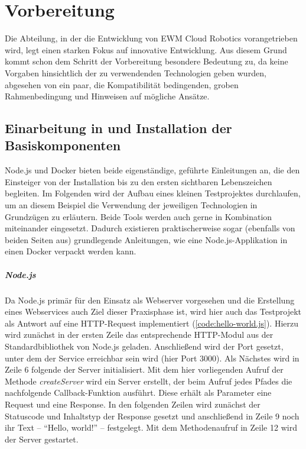 \chapter{Vorbereitung}
Die Abteilung, in der die Entwicklung von \ac{EWM} Cloud Robotics vorangetrieben wird, legt einen starken Fokus auf innovative Entwicklung.
Aus diesem Grund kommt schon dem Schritt der Vorbereitung besondere Bedeutung zu, da keine Vorgaben hinsichtlich der zu verwendenden Technologien geben wurden, abgesehen von ein paar, die Kompatibilität bedingenden, groben Rahmenbedingung und Hinweisen auf mögliche Ansätze.


\section{Einarbeitung in und Installation der Basiskomponenten}
\label{sec:einarbeitung}
Node.js und Docker bieten beide eigenständige, geführte Einleitungen an, die den Einsteiger von der Installation bis zu den ersten sichtbaren Lebenszeichen begleiten.
Im Folgenden wird der Aufbau eines kleinen Testprojektes durchlaufen, um an diesem Beispiel die Verwendung der jeweiligen Technologien in Grundzügen zu erläutern.
Beide Tools werden auch gerne in Kombination miteinander eingesetzt.
Dadurch existieren praktischerweise sogar (ebenfalls von beiden Seiten aus) grundlegende Anleitungen, wie eine Node.js-Applikation in einen Docker verpackt werden kann.~\cite{docker-node-hello}

\paragraph{Node.js}
Da Node.js primär für den Einsatz als Webserver vorgesehen und die Erstellung eines Webservices auch Ziel dieser Praxisphase ist, wird hier auch das Testprojekt als Antwort auf eine \ac{HTTP}-Request implementiert (\autoref{code:hello-world.js}).
Hierzu wird zunächst in der ersten Zeile das entsprechende \ac{HTTP}-Modul aus der Standardbibliothek von Node.js geladen.
Anschließend wird der Port gesetzt, unter dem der Service erreichbar sein wird (hier Port 3000).
Als Nächstes wird in Zeile 6 folgende der Server initialisiert.
Mit dem hier vorliegenden Aufruf der Methode \emph{createServer} wird ein Server erstellt, der beim Aufruf jedes Pfades die nachfolgende Callback-Funktion ausführt.
Diese erhält als Parameter eine Request und eine Response.
In den folgenden Zeilen wird zunächst der Statuscode und Inhaltstyp der Response gesetzt und anschließend in Zeile 9 noch ihr Text -- \enquote{Hello, world!} -- festgelegt.
Mit dem Methodenaufruf in Zeile 12 wird der Server gestartet.



